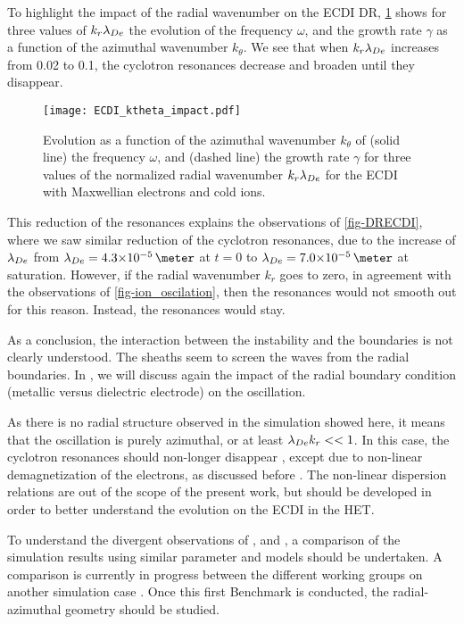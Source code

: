   To highlight the impact of the radial wavenumber on the \ac{ECDI} \ac{DR}, \cref{fig-kreffect} shows for three values of $k_r \lambda_{De}$ the evolution of the frequency $\omega$, and  the growth rate $\gamma$ as a function of the azimuthal wavenumber $k_{\theta}$.
  We see that when $k_r \lambda_{De}$ increases from 0.02 to 0.1, the cyclotron resonances decrease and broaden until they disappear.
  \begin{figure}[!hbt]
    \centering
    \texttt{[image: ECDI\_ktheta\_impact.pdf]}
    \caption{Evolution as a function of the azimuthal wavenumber $k_{\theta}$ of (solid line) the frequency $\omega$, and (dashed line) the growth rate $\gamma$ for three values of the normalized radial wavenumber $k_r \lambda_{De}$ for the \acs{ECDI} with Maxwellian electrons and cold ions. }
    \label{fig-kreffect}
  \end{figure}
  
  This reduction of the resonances explains the observations of \cref{fig-DRECDI}, where we saw similar reduction of the cyclotron resonances, due to the increase of $\lambda_{De}$ from $\lde=\sn{4.3}{-5}\,\meter$ at $t=0$ to $\lde=\sn{7.0}{-5}\,\meter$ at saturation.
  However, if the radial wavenumber $k_r$ goes to zero, in agreement with the observations of \cref{fig-ion_oscilation}, then the resonances would not smooth out for this reason.
  Instead, the resonances would stay.
  
  \vspace{1em}
  As a conclusion, the interaction between the instability and the boundaries is not clearly understood.
  The sheaths seem to  screen the waves from the radial boundaries.
  In , we will discuss again the impact of the radial boundary condition (metallic versus dielectric electrode) on the oscillation.

  As there is no radial structure observed in the simulation showed here, it means that the oscillation is purely azimuthal, or at least $\lambda_{De} k_r <<1$.
  In this case, the cyclotron resonances should non-longer disappear \citep{ducrocq2006}, except due to non-linear demagnetization of the electrons, as discussed before \citep{boeuf2018,taccogna2019}.
  The non-linear dispersion relations are out of the scope of the present work, but should be developed in order to better understand the evolution on the \ac{ECDI} in the \ac{HET}.
  
  To understand the divergent observations of \citet{hara2019a,janhunen2018}, and \citet{taccogna2019}, a comparison of the simulation results using similar parameter and models should be undertaken.
  A comparison is currently in progress between the different working groups on another simulation case \citep{charoy2019}. 
  Once this first Benchmark is conducted, the radial-azimuthal geometry should be studied.
  
  
  
  